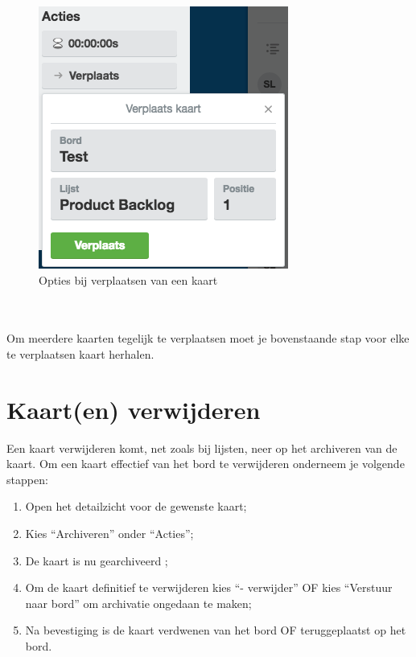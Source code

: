\begin{figure}[h]
	\centering
	\includegraphics[scale=0.6]{./afbeeldingen/verplaats_kaart.png}
	\caption{Opties bij verplaatsen van een kaart}
	\label{fig:verplaats_kaart}	
\end{figure} 
\noindent
\\\\Om meerdere kaarten tegelijk te verplaatsen moet je bovenstaande stap voor elke te verplaatsen kaart herhalen.

\section{Kaart(en) verwijderen}

Een kaart verwijderen komt, net zoals bij lijsten, neer op het archiveren van de kaart. Om een kaart effectief van het bord te verwijderen onderneem je volgende stappen:
\begin{enumerate}[nolistsep]
	\item Open het detailzicht voor de gewenste kaart;
	\item Kies ``Archiveren'' onder ``Acties'';
	\item De kaart is nu gearchiveerd ;
	\item Om de kaart definitief te verwijderen kies ``- verwijder'' OF kies ``\CircleArrowleft  Verstuur naar bord'' om archivatie ongedaan te maken;
	\item Na bevestiging is de kaart verdwenen van het bord OF teruggeplaatst op het bord.
\end{enumerate}

